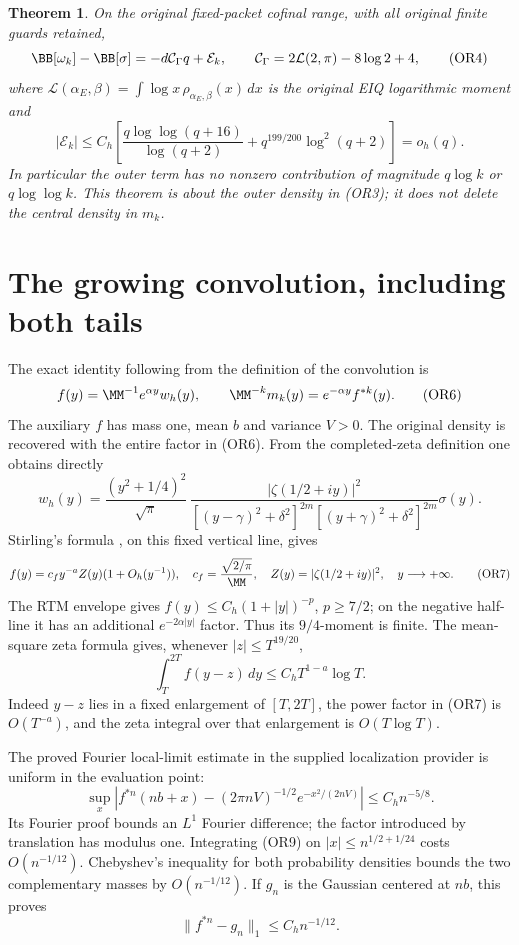 \documentclass[11pt,a4paper]{article}
\newtheorem{theorem}{Theorem}[section]
\begin{document}
\begin{theorem}
On the original fixed-packet cofinal range, with all original finite
guards retained,
\[
 \BB[\omega_k]-\BB[\sigma]
 =-d\mathcal C_\Gamma q+\mathcal E_k,\qquad
 \mathcal C_\Gamma=2\mathcal L(2,\pi)-8\log2+4,          \tag{OR4}
\]
where \(\mathcal L(\alpha_E,\beta)=\int\log x\,\rho_{\alpha_E,\beta}(x)\,dx\)
is the original EIQ logarithmic moment and
\[
 |\mathcal E_k|\leq C_h\left[
 \frac{q\log\log(q+16)}{\log(q+2)}
 +q^{199/200}\log^2(q+2)\right]=o_h(q).                \tag{OR5}
\]
In particular the outer term has no nonzero contribution of magnitude
\(q\log k\) or \(q\log\log k\).  This theorem is about the outer density
in (OR3); it does not delete the central density in \(m_k\).
\end{theorem}

\section{The growing convolution, including both tails}
The exact identity following from the definition of the convolution is
\[
 f(y)=\MM^{-1}e^{\alpha y}w_h(y),\qquad
 \MM^{-k}m_k(y)=e^{-\alpha y}f^{*k}(y).                \tag{OR6}
\]
The auxiliary \(f\) has mass one, mean \(b\) and variance \(V>0\).
The original density is recovered with the entire factor in (OR6).
From the completed-zeta definition one obtains directly
\[
 w_h(y)=\frac{(y^2+1/4)^2}{\sqrt\pi}\,
 \frac{|\zeta(1/2+iy)|^2}
 {[(y-\gamma)^2+\delta^2]^{2m}[(y+\gamma)^2+\delta^2]^{2m}}\sigma(y).
\]
Stirling's formula \cite{or:DLMFgamma}, on this fixed vertical line, gives
\[
 f(y)=c_fy^{-a}Z(y)(1+O_h(y^{-1})),\quad
 c_f=\frac{\sqrt{2/\pi}}{\MM},\quad
 Z(y)=|\zeta(1/2+iy)|^2,\quad y\longrightarrow+\infty. \tag{OR7}
\]
The RTM envelope gives \(f(y)\leq C_h(1+|y|)^{-p}\), \(p\geq7/2\);
on the negative half-line it has an additional
\(e^{-2\alpha|y|}\) factor.  Thus its \(9/4\)-moment is finite.
The mean-square zeta formula gives, whenever \(|z|\leq T^{19/20}\),
\[
 \int_T^{2T}f(y-z)\,dy\leq C_h T^{1-a}\log T.          \tag{OR8}
\]
Indeed \(y-z\) lies in a fixed enlargement of \([T,2T]\), the power
factor in (OR7) is \(O(T^{-a})\), and the zeta integral over that
enlargement is \(O(T\log T)\).

The proved Fourier local-limit estimate in the supplied localization
provider is uniform in the evaluation point:
\[
 \sup_x\left|f^{*n}(nb+x)
 -(2\pi nV)^{-1/2}e^{-x^2/(2nV)}\right|
 \leq C_h n^{-5/8}.                                  \tag{OR9}
\]
Its Fourier proof bounds an \(L^1\) Fourier difference; the factor
introduced by translation has modulus one.  Integrating (OR9) on
\(|x|\leq n^{1/2+1/24}\) costs \(O(n^{-1/12})\).
Chebyshev's inequality for both probability densities bounds the two
complementary masses by \(O(n^{-1/12})\).  If \(g_n\) is the Gaussian
centered at \(nb\), this proves
\[
 \|f^{*n}-g_n\|_1\leq C_h n^{-1/12}.                  \tag{OR10}
\]
\end{document}
